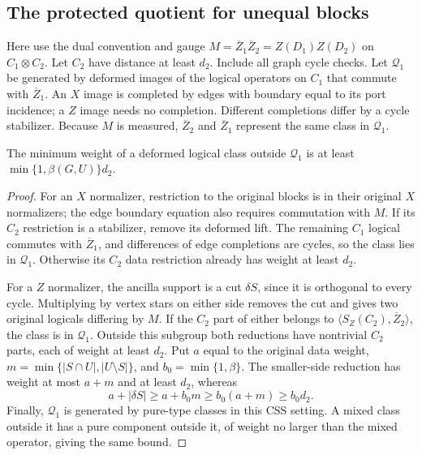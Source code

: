 \subsection{The protected quotient for unequal blocks}
Here use the dual convention and gauge
$M=\overline Z_1\overline Z_2=Z(D_1)Z(D_2)$ on $C_1\otimes C_2$.
Let $C_2$ have distance at least $d_2$. Include all graph cycle checks.
Let $\mathcal Q_1$ be generated by deformed images of the logical
operators on $C_1$ that commute with $\overline Z_1$. An $X$ image is
completed by edges with boundary equal to its port incidence; a $Z$
image needs no completion. Different completions differ by a cycle
stabilizer. Because $M$ is measured, $\overline Z_2$ and
$\overline Z_1$ represent the same class in $\mathcal Q_1$.

\begin{lemma}
The minimum weight of a deformed logical class outside $\mathcal Q_1$
is at least $\min\{1,\beta(G,U)\}d_2$.
\end{lemma}
\begin{proof}
For an $X$ normalizer, restriction to the original blocks is in their
original $X$ normalizers; the edge boundary equation also requires
commutation with $M$. If its $C_2$ restriction is a stabilizer, remove
its deformed lift. The remaining $C_1$ logical commutes with
$\overline Z_1$, and differences of edge completions are cycles, so
the class lies in $\mathcal Q_1$. Otherwise its $C_2$ data restriction
already has weight at least $d_2$.

For a $Z$ normalizer, the ancilla support is a cut $\delta S$, since
it is orthogonal to every cycle. Multiplying by vertex stars on either
side removes the cut and gives two original logicals differing by $M$.
If the $C_2$ part of either belongs to
$\langle S_Z(C_2),\overline Z_2\rangle$, the class is in
$\mathcal Q_1$. Outside this subgroup both reductions have nontrivial
$C_2$ parts, each of weight at least $d_2$. Put $a$ equal to the
original data weight, $m=\min\{|S\cap U|,|U\setminus S|\}$, and
$b_0=\min\{1,\beta\}$. The smaller-side reduction has weight at
most $a+m$ and at least $d_2$, whereas
\begin{equation}
 a+|\delta S|\ge a+b_0m\ge b_0(a+m)\ge b_0d_2.
\end{equation}
Finally, $\mathcal Q_1$ is generated by pure-type classes in this CSS
setting. A mixed class outside it has a pure component outside it, of
weight no larger than the mixed operator, giving the same bound.
\end{proof}

